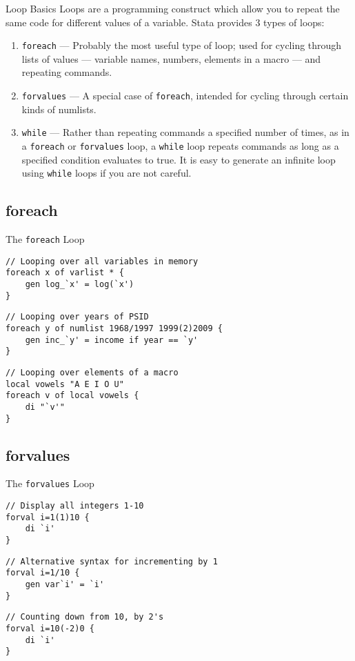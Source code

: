 \documentclass[fleqn, handout, 10pt]{beamer}
\def\lst{\lstinline}
\begin{document}
\begin{frame}{Loop Basics}
    Loops are a programming construct which allow you to repeat the same code for different values of a variable. Stata provides 3 types of loops: \pause
    \begin{enumerate}
	\item \lst=foreach= --- Probably the most useful type of loop; used for cycling through lists of values --- variable names, numbers, elements in a macro --- and repeating commands. \pause
	\item \lst=forvalues= --- A special case of \lst+foreach+, intended for cycling through certain kinds of numlists. \pause
	\item \lst=while= --- Rather than repeating commands a specified number of times, as in a \lst=foreach= or \lst=forvalues= loop, a \lst=while= loop repeats commands as long as a specified condition evaluates to true. It is easy to generate an infinite loop using \lst+while+ loops if you are not careful. \pause
    \end{enumerate}
\end{frame}

\subsection{foreach}
\begin{frame}[fragile]{The \lst=foreach= Loop}
    \begin{lstlisting}
// Looping over all variables in memory
foreach x of varlist * {
    gen log_`x' = log(`x')
}
    \end{lstlisting}

    \begin{lstlisting}
// Looping over years of PSID
foreach y of numlist 1968/1997 1999(2)2009 {
    gen inc_`y' = income if year == `y'
}
    \end{lstlisting}

    \begin{lstlisting}
// Looping over elements of a macro
local vowels "A E I O U"
foreach v of local vowels {
    di "`v'"
}
    \end{lstlisting}
\end{frame}


\subsection{forvalues}
\begin{frame}[fragile]{The \lst=forvalues= Loop}
    \begin{lstlisting}
// Display all integers 1-10
forval i=1(1)10 {
    di `i'
}
    \end{lstlisting}

    \begin{lstlisting}
// Alternative syntax for incrementing by 1
forval i=1/10 {
    gen var`i' = `i'
}
    \end{lstlisting}

    \begin{lstlisting}
// Counting down from 10, by 2's
forval i=10(-2)0 {
    di `i'
}
    \end{lstlisting}
\end{frame}
\end{document}
